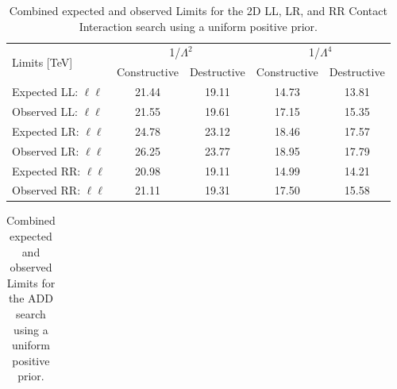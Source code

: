 \begin{table}[p]
\centering
\begin{tabular}{ |l|c|c|c|c| }
    \hline
    \multirow{2}{*}{Limits [TeV]} & \multicolumn{2}{c|}{1/$\Lambda^2$} & \multicolumn{2}{c|}{1/$\Lambda^4$} \\
    \cline{2-5}
     & Constructive & Destructive & Constructive & Destructive \\
    \hline
    Expected LL: $\ell\ell$ & 21.44 & 19.11 & 14.73 & 13.81 \\
    Observed LL: $\ell\ell$  & 21.55 & 19.61 & 17.15 & 15.35 \\
    \hline
    Expected LR: $\ell\ell$ & 24.78 & 23.12 & 18.46 & 17.57 \\
    Observed LR: $\ell\ell$ & 26.25 & 23.77 & 18.95 & 17.79 \\
    \hline
    Expected RR: $\ell\ell$ & 20.98 & 19.11 & 14.99 & 14.21 \\
    Observed RR: $\ell\ell$ & 21.11 & 19.31 & 17.50 & 15.58 \\
    \hline
\end{tabular}
\caption{Combined expected and observed Limits for the 2D LL, LR, and RR Contact Interaction search using a uniform positive prior.}
\label{tab:Comb_Limits_CI}
\end{table}


\begin{table}[p]
\centering
\begin{tabular}{ |l|c|c|c|c| }
    \hline

    \hline
\end{tabular}
\caption{Combined expected and observed Limits for the ADD search using a uniform positive prior.}
\label{tab:Comb_Limits_ADD}
\end{table}








